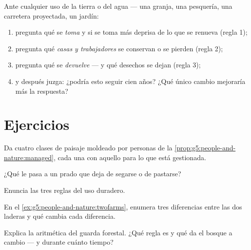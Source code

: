 \begin{method}\label{met:g5:people-and-nature:judge}
Ante cualquier uso de la tierra o del agua --- una granja, una
pesquería, una carretera proyectada, un jardín:
\begin{enumerate}
  \item pregunta qué se \emph{toma} y si se toma más deprisa de lo que
        se renueva (regla 1);
  \item pregunta qué \emph{casas y trabajadores} se conservan o se
        pierden (regla 2);
  \item pregunta qué se \emph{devuelve} --- y qué desechos se dejan
        (regla 3);
  \item y después juzga: ¿podría esto seguir cien años? ¿Qué único
        cambio mejoraría más la respuesta?
\end{enumerate}
\end{method}

\section{Ejercicios}

\begin{exercise}[$\star$]\label{exo:g5:people-and-nature:1}
Da cuatro clases de paisaje moldeado por personas de la
\cref{prop:g5:people-and-nature:managed}, cada una con aquello para lo
que está gestionada.
\end{exercise}

\begin{exercise}[$\star$]\label{exo:g5:people-and-nature:2}
¿Qué le pasa a un prado que deja de segarse o de pastarse?
\end{exercise}

\begin{exercise}[$\star$]\label{exo:g5:people-and-nature:3}
Enuncia las tres reglas del uso duradero.
\end{exercise}

\begin{exercise}[$\star$]\label{exo:g5:people-and-nature:4}
En el \cref{ex:g5:people-and-nature:twofarms}, enumera tres
diferencias entre las dos laderas y qué cambia cada diferencia.
\end{exercise}

\begin{exercise}[$\star$]\label{exo:g5:people-and-nature:5}
Explica la aritmética del guarda forestal. ¿Qué regla es y qué da el
bosque a cambio --- y durante cuánto tiempo?
\end{exercise}

